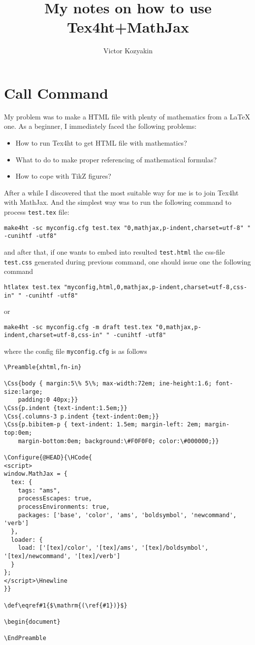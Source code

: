 \documentclass{article}
\title{My notes on how to use Tex4ht+MathJax}
\author{Victor Kozyakin}
\begin{document}
\maketitle

\section{Call Command}\label{S1}
My problem was to make a HTML file with plenty of mathematics from a \LaTeX{}
one. As a beginner, I immediately faced the following problems:
\begin{itemize}
\item How to run Tex4ht to get HTML file with mathematics?
\item What to do to make proper referencing of mathematical formulas?
\item How to cope with TikZ figures?
\end{itemize}

After a while I discovered that the most suitable way for me is to join
Tex4ht with MathJax. And the simplest way was to run the following command to
process \verb|test.tex| file:

{\small
\begin{verbatim}
make4ht -sc myconfig.cfg test.tex "0,mathjax,p-indent,charset=utf-8" " -cunihtf -utf8"
\end{verbatim}}
\noindent and after that, if one wants to embed into resulted
\verb|test.html| the css-file \verb|test.css| generated during previous
command, one should issue one the following command {\small
\begin{verbatim}
htlatex test.tex "myconfig,html,0,mathjax,p-indent,charset=utf-8,css-in" " -cunihtf -utf8"
\end{verbatim}
\noindent or
\begin{verbatim}
make4ht -sc myconfig.cfg -m draft test.tex "0,mathjax,p-indent,charset=utf-8,css-in" " -cunihtf -utf8"
\end{verbatim}}
\noindent where the config file \verb|myconfig.cfg| is as
follows

{\small
\begin{verbatim}
\Preamble{xhtml,fn-in}

\Css{body { margin:5\% 5\%; max-width:72em; ine-height:1.6; font-size:large;
    padding:0 40px;}}
\Css{p.indent {text-indent:1.5em;}}
\Css{.columns-3 p.indent {text-indent:0em;}}
\Css{p.bibitem-p { text-indent: 1.5em; margin-left: 2em; margin-top:0em;
    margin-bottom:0em; background:\#F0F0F0; color:\#000000;}}

\Configure{@HEAD}{\HCode{
<script>
window.MathJax = {
  tex: {
    tags: "ams",
    processEscapes: true,
    processEnvironments: true,
    packages: ['base', 'color', 'ams', 'boldsymbol', 'newcommand', 'verb']
  },
  loader: {
    load: ['[tex]/color', '[tex]/ams', '[tex]/boldsymbol', '[tex]/newcommand', '[tex]/verb']
  }
};
</script>\Hnewline
}}

\def\eqref#1{$\mathrm{(\ref{#1})}$}

\begin{document}

\EndPreamble
\end{verbatim}}
\end{document}
